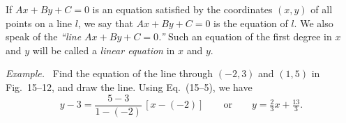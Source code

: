 \documentclass[11pt]{book}
\theoremstyle{bkplain}
\theoremstyle{XIplainnote}
\theoremstyle{bkplain}
\theoremstyle{bkplain}
\newenvironment{XVexample}[1][]{\par\medskip\noindent\emph{Example#1.}\ }{\par\medskip}
\begin{document}
\begin{definition}
If $Ax + By + C = 0$ is an equation satisfied by the coordinates $(x, y)$ of
all points on a line $l$, we say that $Ax + By + C = 0$ is the equation of
$l$. We also speak of the \emph{``line $Ax + By + C = 0$.''} Such an equation
of the first degree in $x$ and $y$ will be called a \emph{linear equation} in
$x$ and $y$.
\end{definition}

\FIGXVTWELVE

\begin{XVexample}
Find the equation of the line through $(-2, 3)$ and $(1, 5)$ in Fig.~15--12,
and draw the line. Using Eq.~(15--5), we have
\[
y - 3 = \frac{5-3}{1-(-2)}\,[x-(-2)]
\qquad\text{or}\qquad
y = \tfrac{2}{3}x + \tfrac{13}{3}.
\]
\end{XVexample}
\end{document}
